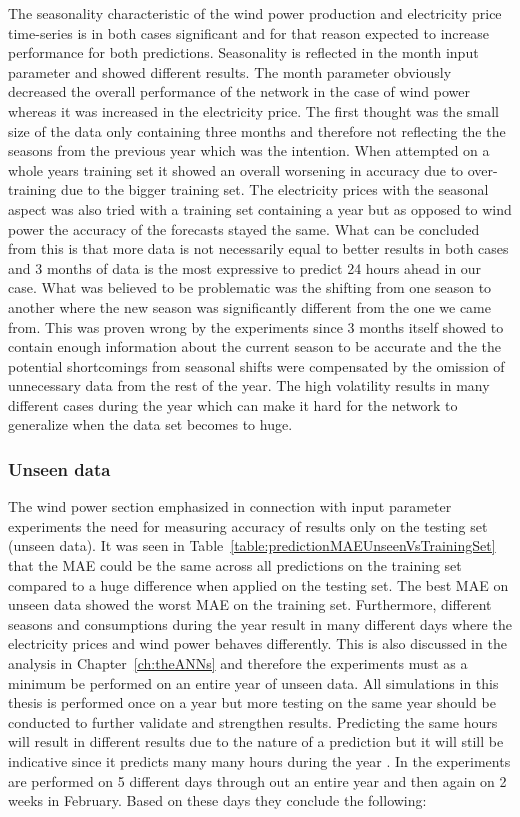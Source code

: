 The seasonality characteristic of the wind power production and electricity price time-series is in both cases significant and for that reason expected to increase performance for both predictions. Seasonality is reflected in the month input parameter and showed different results. The month parameter obviously decreased the overall performance of the network in the case of wind power whereas it was increased in the electricity price. The first thought was the small size of the data only containing three months and therefore not reflecting the the seasons from the previous year which was the intention. When attempted on a whole years training set it showed an overall worsening in accuracy due to over-training due to the bigger training set. The electricity prices with the seasonal aspect was also tried with a training set containing a year but as opposed to wind power the accuracy of the forecasts stayed the same. What can be concluded from this is that more data is not necessarily equal to better results in both cases and 3 months of data is the most expressive to predict 24 hours ahead in our case. What was believed to be problematic was the shifting from one season to another where the new season was significantly different from the one we came from. This was proven wrong by the experiments since 3 months itself showed to contain enough information about the current season to be accurate and the the potential shortcomings from seasonal shifts were compensated by the omission of unnecessary data from the rest of the year. The high volatility results in many different cases during the year which can make it hard for the network to generalize when the data set becomes to huge.

\subsubsection{Unseen data}
The wind power section emphasized in connection with input parameter experiments the need for measuring accuracy of results only on the testing set (unseen data). It was seen in Table~\ref{table:predictionMAEUnseenVsTrainingSet} that the MAE could be the same across all predictions on the training set compared to a huge difference when applied on the testing set. The best MAE on unseen data showed the worst MAE on the training set. Furthermore, different seasons and consumptions during the year result in many different days where the electricity prices and wind power behaves differently. This is also discussed in the analysis in Chapter~\ref{ch:theANNs} and therefore the experiments must as a minimum be performed on an entire year of unseen data. All simulations in this thesis is performed once on a year but more testing on the same year should be conducted to further validate and strengthen results. Predicting the same hours will result in different results due to the nature of a prediction but it will still be indicative since it predicts many many hours during the year . In \cite{1} the experiments are performed on 5 different days through out an entire year and then again on 2 weeks in February. Based on these days they conclude the following:

